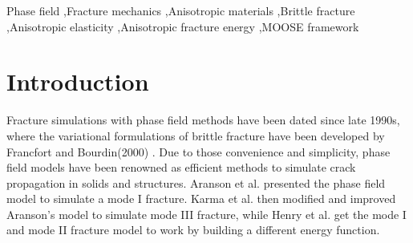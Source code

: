 \documentclass[3p,10pt,sort&compress]{elsarticle}
\begin{document}
\begin{frontmatter}
\begin{abstract}
\end{abstract}

\begin{keyword}

Phase field \sep Fracture mechanics \sep Anisotropic materials \sep Brittle fracture \sep Anisotropic elasticity \sep Anisotropic fracture energy \sep MOOSE framework

\end{keyword}

\end{frontmatter}

\section{Introduction}
\label{sec:introduction}
Fracture simulations with phase field methods have been dated since late 1990s, where the variational formulations of brittle fracture have been developed by Francfort \cite{francfort1998revisiting} and Bourdin(2000) \cite{bourdin2000numerical}. Due to those convenience and simplicity, phase field models have been renowned as efficient methods to simulate crack propagation in solids and structures. Aranson et al.\cite{aranson2000continuum} presented the phase field model to simulate a mode I fracture. Karma et al.\cite{karma2001phase,hakim2009laws} then modified and improved Aranson's model\cite{aranson2000continuum} to simulate mode III fracture, while Henry et al.\cite{henry2004dynamic} get the mode I and mode II fracture model to work by building a different energy function.
\end{document}
